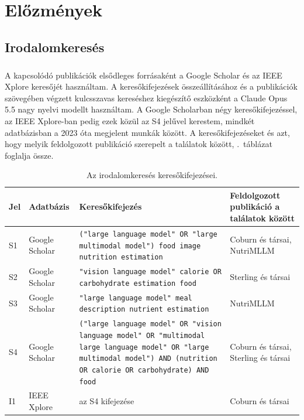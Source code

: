 \chapter{Előzmények}

\section{Irodalomkeresés}
\paragraph{}A kapcsolódó publikációk elsődleges forrásaként a Google Scholar és az IEEE Xplore keresőjét használtam. 
A keresőkifejezések összeállításához és a publikációk szövegében végzett kulcsszavas kereséshez 
kiegészítő eszközként a Claude Opus 5.5 nagy nyelvi modellt használtam. A Google Scholarban négy keresőkifejezéssel, az IEEE Xplore-ban pedig ezek közül az S4 jelűvel kerestem, 
mindkét adatbázisban a 2023 óta megjelent munkák között. A keresőkifejezéseket és azt, hogy melyik feldolgozott publikáció 
szerepelt a találatok között, \az{\ref{tab:irodalomkereses}}.~táblázat foglalja össze.

\begin{table}[h]
\centering
\footnotesize
\begin{tabular}{|p{1.2cm}|p{1.8cm}|p{6.6cm}|p{3.2cm}|}
\hline
\textbf{Jel} & \textbf{Adatbázis} & \textbf{Keresőkifejezés} & \textbf{Feldolgozott publikáció a találatok között} \\
\hline
S1 & Google Scholar & \texttt{("large language model" OR "large multimodal model") food image nutrition estimation} & Coburn és társai, NutriMLLM \\
\hline
S2 & Google Scholar & \texttt{"vision language model" calorie OR carbohydrate estimation food} & Sterling és társai \\
\hline
S3 & Google Scholar & \texttt{"large language model" meal description nutrient estimation} & NutriMLLM \\
\hline
S4 & Google Scholar & \texttt{("large language model" OR "vision language model" OR "multimodal large language model" OR "large multimodal model") AND (nutrition OR calorie OR carbohydrate) AND food} & Coburn és társai, Sterling és társai \\
\hline
I1 & IEEE Xplore & az S4 kifejezése & Coburn és társai \\
\hline
\end{tabular}
\caption{Az irodalomkeresés keresőkifejezései.}
\label{tab:irodalomkereses}
\end{table}

